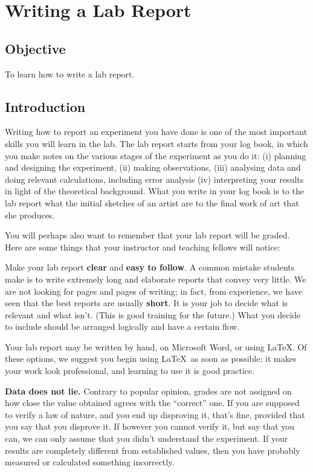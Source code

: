 \chapter{Writing a Lab Report}

\section{Objective}

To learn how to write a lab report. 

\section{Introduction}

Writing how to report an experiment you have done is one of the most important skills you will learn in the lab. The lab report starts from your log book, in which you make notes on the various stages of the experiment as you do it: (i) planning and designing the experiment, (ii) making observations, (iii) analysing data and doing relevant calculations, including error analysis (iv) interpreting your results in light of the theoretical background. What you write in your log book is to the lab report what the initial sketches of an artist are to the final work of art that she produces.

You will perhaps also want to remember that your lab report will be graded. Here are some things that your instructor and teaching fellows will notice:

Make your lab report \textbf{clear} and \textbf{easy to follow}. A common mistake students make is to write extremely long and elaborate reports that convey very little. We are not looking for pages and pages of writing; in fact, from experience, we have seen that the best reports are usually \textbf{short}. It is your job to decide what is relevant and what isn't. (This is good training for the future.) What you decide to include should be arranged logically and have a certain flow. 

\begin{imp}
Your lab report may be written by hand, on Microsoft Word, or using \LaTeX. Of these options, we suggest you begin using \LaTeX\, as soon as possible: it makes your work look professional, and learning to use it is good practice.
\end{imp}

\textbf{Data does not lie.} Contrary to popular opinion, grades are not assigned on how close the value obtained agrees with the ``correct'' one. If you are supposed to verify a law of nature, and you end up disproving it, that's fine, provided that you say that you disprove it. If however you cannot verify it, but say that you can, we can only assume that you didn't understand the experiment. If your results are completely different from established values, then you have probably measured or calculated something incorrectly. 

